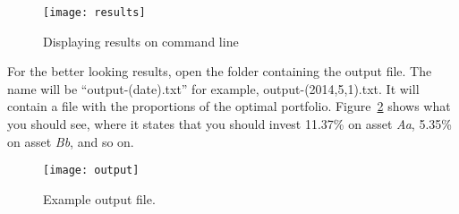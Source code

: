 \begin{figure}[H]
  \centering
    \texttt{[image: results]}
  \caption{Displaying results on command line}
  \label{fig:results}
\end{figure}
For the better looking results, open the folder containing the output file. The name will be ``output-(date).txt'' for example, output-(2014,5,1).txt. It will contain a file with the proportions of the optimal portfolio. Figure~\ref{fig:output} shows what you should see, where it states that you should invest 11.37\% on asset \textit{Aa}, 5.35\% on asset \textit{Bb}, and so on. 
\begin{figure}[H]
  \centering
    \texttt{[image: output]}
  \caption{Example output file.}
  \label{fig:output}
\end{figure}
